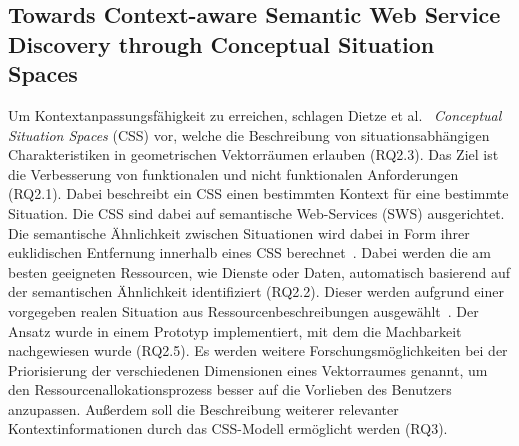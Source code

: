 \documentclass[conference,compsoc,ngerman]{IEEEtran}
\begin{document}
\subsection{Towards Context-aware Semantic Web Service Discovery through Conceptual Situation Spaces}
Um Kontextanpassungsfähigkeit zu erreichen, schlagen Dietze et al.~\cite{dietze2008towards} \textit{Conceptual Situation Spaces} (CSS) vor, welche die Beschreibung von situationsabhängigen Charakteristiken in geometrischen Vektorräumen erlauben (RQ2.3). Das Ziel ist die Verbesserung von funktionalen und nicht funktionalen Anforderungen (RQ2.1). Dabei beschreibt ein CSS einen bestimmten Kontext für eine bestimmte Situation. Die CSS sind dabei auf semantische Web-Services (SWS) ausgerichtet. Die semantische Ähnlichkeit zwischen Situationen wird dabei in Form ihrer euklidischen Entfernung innerhalb eines CSS berechnet~\cite{dietze2008towards}. Dabei werden die am besten geeigneten Ressourcen, wie Dienste oder Daten, automatisch basierend auf der semantischen Ähnlichkeit identifiziert (RQ2.2). Dieser werden aufgrund einer vorgegeben realen Situation aus Ressourcenbeschreibungen ausgewählt~\cite{dietze2008towards}.
Der Ansatz wurde in einem Prototyp implementiert, mit dem die Machbarkeit nachgewiesen wurde (RQ2.5).
Es werden weitere Forschungsmöglichkeiten bei der Priorisierung der verschiedenen Dimensionen eines Vektorraumes genannt, um den Ressourcenallokationsprozess besser auf die Vorlieben des Benutzers anzupassen. Außerdem soll die Beschreibung weiterer relevanter Kontextinformationen durch das CSS-Modell ermöglicht werden (RQ3).
\end{document}
